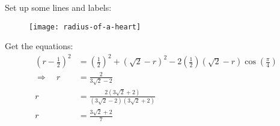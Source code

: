 Set up some lines and labels:
\begin{figure}[H]
\centering
\texttt{[image: radius-of-a-heart]}
\end{figure}
Get the equations:
\begin{align*}
\left(r-\frac{1}{2}\right)^2 
  & = \left(\frac{1}{2}\right)^2
    + \left(\sqrt{2}-r\right)^2
    - 2 \left(\frac{1}{2}\right) (\sqrt{2}-r) \cos{\left(\frac{\pi}{4}\right)} \\
\Rightarrow \quad 
r & = \frac{2}{3\sqrt{2}-2} \\[2ex]
r & = \frac{2(3\sqrt{2}+2)}{(3\sqrt{2}-2)(3\sqrt{2}+2)} \\[2ex]
r & = \frac{3\sqrt{2}+2}{7} 
\end{align*}
